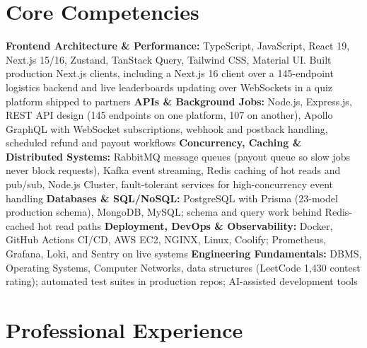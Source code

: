 \documentclass[11pt,a4paper,sans]{moderncv}
\begin{document}
\section{Core Competencies}
\vspace{1pt}
\raggedright
\textbf{Frontend Architecture \& Performance:} TypeScript, JavaScript, React 19, Next.js 15/16, Zustand, TanStack Query, Tailwind CSS, Material UI. Built production Next.js clients, including a Next.js 16 client over a 145-endpoint logistics backend and live leaderboards updating over WebSockets in a quiz platform shipped to partners \textbar{}
\textbf{APIs \& Background Jobs:} Node.js, Express.js, REST API design (145 endpoints on one platform, 107 on another), Apollo GraphQL with WebSocket subscriptions, webhook and postback handling, scheduled refund and payout workflows \textbar{}
\textbf{Concurrency, Caching \& Distributed Systems:} RabbitMQ message queues (payout queue so slow jobs never block requests), Kafka event streaming, Redis caching of hot reads and pub/sub, Node.js Cluster, fault-tolerant services for high-concurrency event handling \textbar{}
\textbf{Databases \& SQL/NoSQL:} PostgreSQL with Prisma (23-model production schema), MongoDB, MySQL; schema and query work behind Redis-cached hot read paths \textbar{}
\textbf{Deployment, DevOps \& Observability:} Docker, GitHub Actions CI/CD, AWS EC2, NGINX, Linux, Coolify; Prometheus, Grafana, Loki, and Sentry on live systems \textbar{}
\textbf{Engineering Fundamentals:} DBMS, Operating Systems, Computer Networks, data structures (LeetCode 1,430 contest rating); automated test suites in production repos; AI-assisted development tools
\par\normalfont


\section{Professional Experience}
\vspace{3pt}
\end{document}
